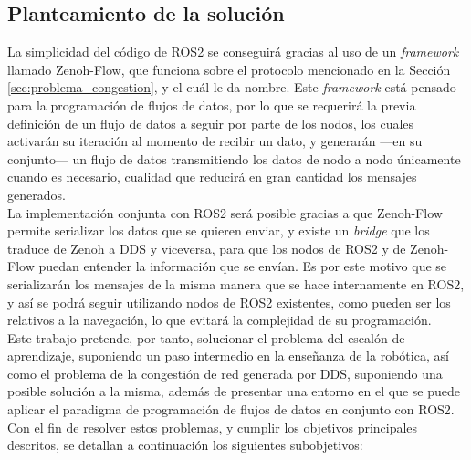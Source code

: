 \subsection{Planteamiento de la solución}
\label{sec:planteamiento_solucion}

La simplicidad del código de ROS2 se conseguirá gracias al uso de un
\textit{framework} llamado Zenoh-Flow, que funciona sobre el protocolo
mencionado en la Sección \ref{sec:problema_congestion}, y el cuál le da
nombre.
Este \textit{framework} está pensado para la programación de flujos de datos,
por lo que se requerirá la previa definición de un flujo de datos a seguir por
parte de los nodos, los cuales activarán su iteración al momento de recibir un
dato, y generarán ---en su conjunto--- un flujo de datos transmitiendo los datos
de nodo a nodo únicamente cuando es necesario, cualidad que reducirá en gran
cantidad los mensajes generados.
\\

La implementación conjunta con ROS2 será posible gracias a que Zenoh-Flow
permite serializar los datos que se quieren enviar, y existe un \textit{bridge}
que los traduce de Zenoh a DDS y viceversa, para que los nodos de ROS2 y de
Zenoh-Flow puedan entender la información que se envían.
Es por este motivo que se serializarán los mensajes de la misma manera que se
hace internamente en ROS2, y así se podrá seguir utilizando nodos de ROS2
existentes, como pueden ser los relativos a la navegación, lo que evitará la
complejidad de su programación.
\\

Este trabajo pretende, por tanto, solucionar el problema del escalón de
aprendizaje, suponiendo un paso intermedio en la enseñanza de la robótica, así
como el problema de la congestión de red generada por DDS, suponiendo una
posible solución a la misma, además de presentar una entorno en el que se puede
aplicar el paradigma de programación de flujos de datos en conjunto con ROS2.
\\

Con el fin de resolver estos problemas, y cumplir los objetivos principales
descritos, se detallan a continuación los siguientes subobjetivos:

